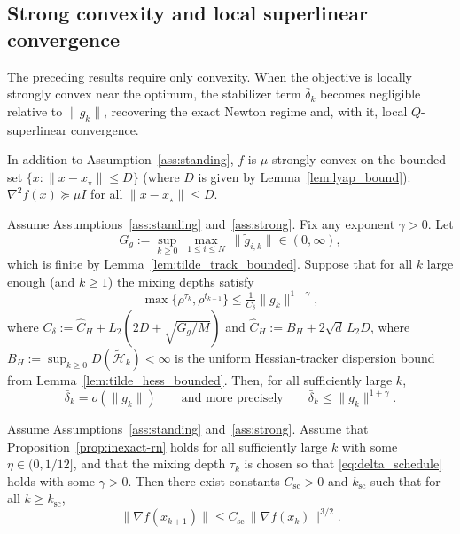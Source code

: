 \documentclass[review,onefignum,onetabnum]{siamart171218}
\begin{document}
	\subsection{Strong convexity and local superlinear convergence}\label{ssec:superlinear}
	The preceding results require only convexity.
	When the objective is locally strongly convex near the optimum,
	the stabilizer term $\bar\delta_k$ becomes negligible relative to
	$\|g_k\|$, recovering the exact Newton regime and, with it, local
	$Q$-superlinear convergence.
	
	\begin{assumption}\label{ass:strong}
		In addition to Assumption~\ref{ass:standing}, $f$ is $\mu$-strongly convex on the bounded set
		$\{x:\|x-x_\star\|\le D\}$ (where $D$ is given by Lemma~\ref{lem:lyap_bound}):
		$\nabla^2 f(x)\succeq \mu I$ for all $\|x-x_\star\|\le D$.
	\end{assumption}
	
	\begin{lemma}\label{lem:delta_o_g}
		Assume Assumptions~\ref{ass:standing} and~\ref{ass:strong}.
		Fix any exponent $\gamma>0$.
		Let
		\[
		G_g:=\sup_{k\ge 0}\ \max_{1\le i\le N}\ \|\tilde g_{i,k}\|\in(0,\infty),
		\]
		which is finite by Lemma~\ref{lem:tilde_track_bounded}.
		Suppose that for all $k$ large enough (and $k\ge 1$) the mixing depths satisfy
		\begin{equation}\label{eq:delta_schedule}
			\max\{\rho^{\tau_k},\rho^{t_{k-1}}\}\le \tfrac{1}{C_\delta}\|g_k\|^{1+\gamma},
		\end{equation}
		where $C_\delta:=\hat C_H+L_2(2D+\sqrt{G_g/M})$ and $\hat C_H:=B_H+2\sqrt{d}\,L_2D$,
		where $B_H:=\sup_{k\ge0}D(\tilde{\mathcal H}_k)<\infty$
		is the uniform Hessian-tracker dispersion bound from Lemma~\ref{lem:tilde_hess_bounded}.
		Then, for all sufficiently large $k$,
		\[
		\bar\delta_k = o(\|g_k\|)\qquad\text{and more precisely}\qquad \bar\delta_k\le \|g_k\|^{1+\gamma}.
		\]
	\end{lemma}
	
	\begin{theorem}\label{thm:superlinear}
		Assume Assumptions~\ref{ass:standing} and~\ref{ass:strong}.
		Assume that Proposition~\ref{prop:inexact-rn} holds for all sufficiently large $k$ with some $\eta\in(0,1/12]$,
		and that the mixing depth $\tau_k$ is chosen so that \eqref{eq:delta_schedule} holds with some $\gamma>0$.
		Then there exist constants $C_{\mathrm{sc}}>0$ and $k_{\mathrm{sc}}$ such that for all $k\ge k_{\mathrm{sc}}$,
		\[
		\|\nabla f(\bar x_{k+1})\|\le C_{\mathrm{sc}}\,\|\nabla f(\bar x_k)\|^{3/2}.
		\]
	\end{theorem}
	
\end{document}

